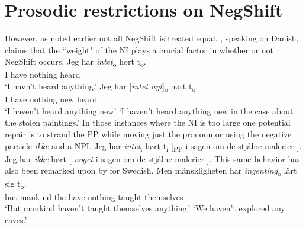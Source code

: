 \documentclass[12pt, letterpaper]{article}
\begin{document}
\section{Prosodic restrictions on NegShift} \label{sec:PROSODY}

However, as noted earlier not all NegShift is treated equal. \citet[65f]{christensenInterfacesNegationSyntax2005}, speaking on Danish, claims that the ``weight" of the NI plays a crucial factor in whether or not NegShift occurs. 
	\ea \label{ex:weight}
		\ea 
		\gll Jeg har \textit{intet}\textsubscript{o} hørt t\textsubscript{o}.\\
		I have nothing heard\\
		\glt  `I havn't heard anything.'
		\ex 
		\gll Jeg har [\textit{intet} \textit{nyt}]\textsubscript{o} hørt t\textsubscript{o}.\\
		I have nothing new heard\\
		\glt `I haven't heard anything new'
		\glt `I haven't heard anything new in the case about the stolen paintings.'
		\z 
	\z
In those instances where the NI is too large one potential repair is to strand the PP while moving just the pronoun or using the negative particle \textit{ikke} and a NPI.
	\ea 
		\ea Jeg har \textit{intet}\textsubscript{i} hørt t\textsubscript{i} [\textsubscript{PP} i sagen om de stjålne malerier ]. \label{ex:split}
		\ex Jeg har \textit{ikke} hørt [ \textit{noget} i sagen om de stjålne malerier ].
		\z 
	\z   
This same behavior has also been remarked upon by \citet{penkaNegativeIndefinites2011} for Swedish.
	\ea 
		\ea 
		\gll Men mänskligheten har \textit{ingenting}\textsubscript{o} lärt sig t\textsubscript{o}.\\
		but mankind-the have nothing taught themselves\\
		\glt `But mankind haven't taught themselves anything.'
		\glt `We haven't explored any caves.'
		\z 
	\z 
\end{document}

